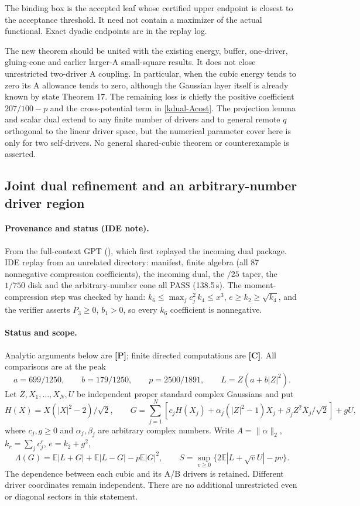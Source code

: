 The binding box is the accepted leaf whose certified upper endpoint is
closest to the acceptance threshold. It need not contain a maximizer
of the actual functional. Exact dyadic endpoints are in the replay log.

The new theorem should be united with the existing energy, buffer,
one-driver, gluing-cone and earlier larger-A small-square results.
It does not close unrestricted two-driver A coupling. In particular,
when the cubic energy tends to zero its A allowance tends to zero,
although the Gaussian layer itself is already known by state Theorem 17.
The remaining loss is chiefly the positive coefficient
$207/100-p$ and the cross-potential term in \eqref{kdual-Acost}.
The projection lemma and scalar dual extend to any finite number of
drivers and to general remote $q$ orthogonal to the linear driver space,
but the numerical parameter cover here is only for two self-drivers.
No general shared-cubic theorem or counterexample is asserted.

\subsection{Joint dual refinement and an arbitrary-number driver region}
\label{sec:k-joint-dual-refinement}

\paragraph{Provenance and status (IDE note).} From the full-context GPT (), which first replayed the
incoming dual package. IDE replay  from an unrelated directory: manifest, finite algebra (all 87 nonnegative compression coefficients), the incoming dual, the $/25$ taper, the $1/750$ disk and the arbitrary-number cone all PASS (138.5\,s). The moment-compression step was checked by hand: $k_6\le
\max_jc_j^2\,k_4\le x^3$, $e\ge k_2\ge\sqrt{k_4}$, and the verifier asserts $P_3\ge0$, $b_1>0$, so every $k_6$ coefficient is nonnegative.

\paragraph{Status and scope.}
Analytic arguments below are \textbf{[P]}; finite directed computations
are \textbf{[C]}. All comparisons are at the peak
\[
 a=699/1250,\qquad b=179/1250,\qquad p=2500/1891,\qquad
 L=Z(a+b|Z|^2).
\]
Let $Z,X_1,\ldots,X_N,U$ be independent proper standard complex
Gaussians and put
\[
 H(X)=X(|X|^2-2)/\sqrt2,\qquad
 G=\sum_{j=1}^N\left[c_jH(X_j)+\alpha_j(|Z|^2-1)X_j+
             \beta_jZ^2\overline X_j/\sqrt2\right]+gU,
\]
where $c_j,g\ge0$ and $\alpha_j,\beta_j$ are arbitrary complex numbers.
Write $A=\|\alpha\|_2$, $k_r=\sum_jc_j^r$, $e=k_2+g^2$,
\[
 \Lambda(G)=\mathbb E|L+G|+\mathbb E|L-G|-p\mathbb E|G|^2,\qquad
 S=\sup_{v\ge0}\{2\mathbb E|L+\sqrt vU|-pv\}.
\]
The dependence between each cubic and its A/B drivers is retained.
Different driver coordinates remain independent. There are no
additional unrestricted even or diagonal sectors in this statement.

